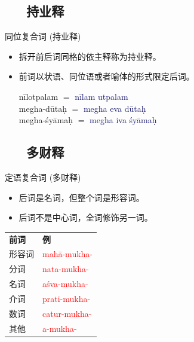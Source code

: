 \documentclass[17pt]{beamer}
\newcommand{\nounstem}[1]{\textcolor{red}{#1\nobreakdash-}}
\newcommand{\fullpada}[1]{\textcolor{OliveGreen}{#1}}
\newcommand{\fullsentence}[1]{\textcolor{MidnightBlue}{#1}}
\begin{document}
\subsection{~~~持业释}
\begin{frame}{同位复合词 (持业释)}
  \small
  \begin{itemize}
    \item 拆开前后词同格的依主释称为持业释。
    \item 前词以状语、同位语或者喻体的形式限定后词。
    \bigskip

    \fullpada{nīlotpalam} $=$ \fullsentence{nīlam utpalam} \\
    \fullpada{megha\nobreakdash-dūtaḥ} $=$ \fullsentence{megha eva dūtaḥ} \\
    \fullpada{megha\nobreakdash-śyāmaḥ} $=$ \fullsentence{megha iva śyāmaḥ} \\
  \end{itemize}
\end{frame}

\subsection{~~~多财释}
\begin{frame}{定语复合词 (多财释)}
  \small
  \begin{itemize}
    \item 后词是名词，但整个词是形容词。
    \item 后词不是中心词，全词修饰另一词。
  \end{itemize}
   \centering
  \begin{tabular}{@{}ll@{}} %
    \textbf{前词} & \textbf{例} \\
    形容词 & \nounstem{mahā\nobreakdash-mukha}  \\
    分词 & \nounstem{nata\nobreakdash-mukha}  \\
    名词 & \nounstem{aśva\nobreakdash-mukha}  \\
    介词 & \nounstem{prati\nobreakdash-mukha}  \\
    数词 & \nounstem{catur\nobreakdash-mukha}  \\
    其他 & \nounstem{a\nobreakdash-mukha}  \\
  \end{tabular}
\end{frame}
\end{document}
